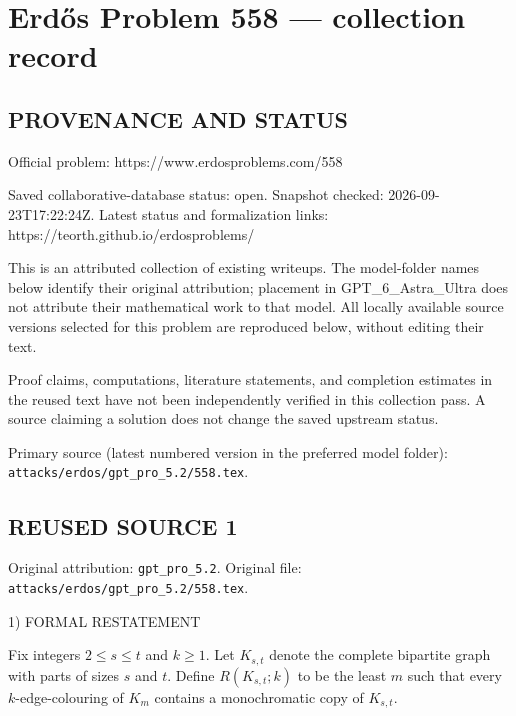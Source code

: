 \section*{Erd\H{o}s Problem 558 --- collection record}

\subsection*{PROVENANCE AND STATUS}
Official problem: https://www.erdosproblems.com/558

Saved collaborative-database status: open.
Snapshot checked: 2026-09-23T17:22:24Z.
Latest status and formalization links: https://teorth.github.io/erdosproblems/

This is an attributed collection of existing writeups. The model-folder names below identify their original attribution; placement in GPT\_6\_Astra\_Ultra does not attribute their mathematical work to that model. All locally available source versions selected for this problem are reproduced below, without editing their text.

Proof claims, computations, literature statements, and completion estimates in the reused text have not been independently verified in this collection pass. A source claiming a solution does not change the saved upstream status.

Primary source (latest numbered version in the preferred model folder): \texttt{attacks/erdos/gpt\_pro\_5.2/558.tex}.

\subsection*{REUSED SOURCE 1}
Original attribution: \texttt{gpt\_pro\_5.2}.
Original file: \texttt{attacks/erdos/gpt\_pro\_5.2/558.tex}.


1) FORMAL RESTATEMENT

Fix integers $2\le s\le t$ and $k\ge 1$.
Let $K_{s,t}$ denote the complete bipartite graph with parts of sizes $s$ and $t$.
Define $R(K_{s,t};k)$ to be the least $m$ such that every $k$-edge-colouring of $K_m$ contains a monochromatic copy of $K_{s,t}$.

